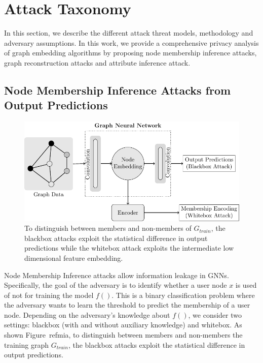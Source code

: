 \section{Attack Taxonomy}\label{attack}

In this section, we describe the different attack threat models, methodology and adversary assumptions.
In this work, we provide a comprehensive privacy analysis of graph embedding algorithms by proposing node membership inference attacks, graph reconstruction attacks and attribute inference attack.


\subsection{Node Membership Inference Attacks from Output Predictions}


\begin{figure}[!htb]
\centering
\includegraphics[width=0.85\linewidth]{./figures/Attacks/MIA.pdf}
\caption{To distinguish between members and non-members of $G_{train}$, the blackbox attacks exploit the statistical difference in output predictions while the whitebox attack exploits the intermediate low dimensional feature embedding.}
\label{mia}
\end{figure}

Node Membership Inference attacks allow information leakage in GNNs.
Specifically, the goal of the adversary is to identify whether a user node $x$ is used of not for training the model $f()$.
This is a binary classification problem where the adversary wants to learn the threshold to predict the membership of a user node.
Depending on the adversary's knowledge about $f()$, we consider two settings: blackbox (with and without auxiliary knowledge) and whitebox. %
As shown Figure~ref{mia}, to distinguish between members and non-members the training graph $G_{train}$, the blackbox attacks exploit the statistical difference in output predictions.


